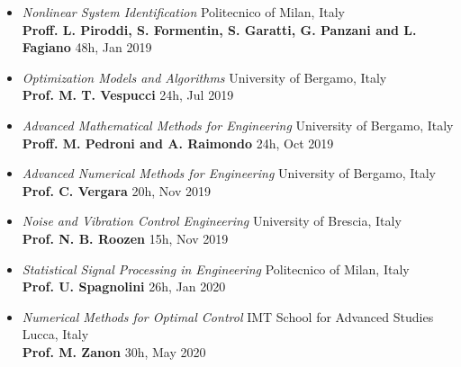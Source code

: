 \documentclass[10pt]{article}
\begin{document}
\begin{itemize}	
	\setlength\itemsep{-6pt}
	\renewcommand\labelitemi{$\vcenter{\hbox{\tiny$\bullet$}}$}

	\item \textit{Nonlinear System Identification} \hfill Politecnico of Milan, Italy\\
	\textbf{Proff. L. Piroddi, S. Formentin, S. Garatti, G. Panzani and L. Fagiano} \hfill 48h, Jan 2019\\
	
	\item \textit{Optimization Models and Algorithms} \hfill University of Bergamo, Italy\\
	\textbf{Prof. M. T. Vespucci} \hfill 24h, Jul 2019\\
	 
	\item \textit{Advanced Mathematical Methods for Engineering} \hfill University of Bergamo, Italy\\
	\textbf{Proff. M. Pedroni and A. Raimondo} \hfill 24h, Oct 2019\\
	 
	\item \textit{Advanced Numerical Methods for Engineering} \hfill University of Bergamo, Italy\\
	\textbf{Prof. C. Vergara} \hfill 20h, Nov 2019\\
	 

	\item \textit{Noise and Vibration Control Engineering} \hfill University of Brescia, Italy\\
	\textbf{Prof. N. B. Roozen} \hfill 15h, Nov 2019\\
	
	\item \textit{Statistical Signal Processing in Engineering} \hfill Politecnico of Milan, Italy\\
	\textbf{Prof. U. Spagnolini} \hfill 26h, Jan 2020\\
	 
	\item \textit{Numerical Methods for Optimal Control} \hfill IMT School for Advanced Studies Lucca, Italy\\
	\textbf{Prof. M. Zanon} \hfill 30h, May 2020\\
	

\end{itemize}
\end{document}
